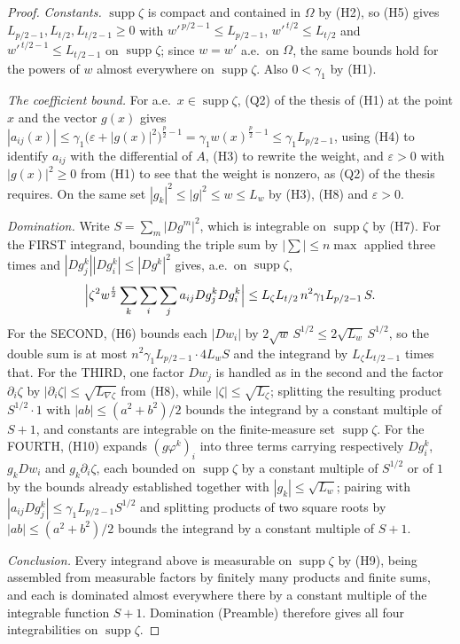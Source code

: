 \begin{proof}
\emph{Constants.}  $\operatorname{supp}\zeta$ is compact and contained in
$\Omega$ by (H2), so (H5) gives $L_{p/2-1},L_{t/2},L_{t/2-1}\ge0$ with
$w'^{\,p/2-1}\le L_{p/2-1}$, $w'^{\,t/2}\le L_{t/2}$ and
$w'^{\,t/2-1}\le L_{t/2-1}$ on $\operatorname{supp}\zeta$; since $w=w'$ a.e.\
on $\Omega$, the same bounds hold for the powers of $w$ almost everywhere on
$\operatorname{supp}\zeta$.  Also $0<\gamma_1$ by (H1).

\emph{The coefficient bound.}  For a.e.\ $x\in\operatorname{supp}\zeta$,
(Q2) of the thesis of (H1) at the point $x$ and the vector $g(x)$ gives
$|a_{ij}(x)|\le\gamma_1\bigl(\varepsilon+|g(x)|^2\bigr)^{\frac p2-1}
  =\gamma_1w(x)^{\frac p2-1}\le\gamma_1L_{p/2-1}$,
using (H4) to identify $a_{ij}$ with the differential of $A$, (H3) to rewrite
the weight, and $\varepsilon>0$ with $|g(x)|^2\ge0$ from (H1) to see that the
weight is nonzero, as (Q2) of the thesis requires.  On the same set $|g_k|^2\le|g|^2
\le w\le L_w$ by (H3), (H8) and $\varepsilon>0$.

\emph{Domination.}  Write $S=\sum_m|Dg^m|^2$, which is integrable on
$\operatorname{supp}\zeta$ by (H7).  For the FIRST integrand, bounding the
triple sum by $|\sum|\le n\max$ applied three times and
$|Dg^k_j||Dg^k_i|\le|Dg^k|^2$ gives, a.e.\ on $\operatorname{supp}\zeta$,
\[
\Bigl|\zeta^2w^{\frac t2}\sum_k\sum_i\sum_ja_{ij}Dg^k_jDg^k_i\Bigr|
\le L_\zeta L_{t/2}\,n^2\gamma_1L_{p/2-1}\,S .
\]
For the SECOND, (H6) bounds each $|Dw_i|$ by
$2\sqrt{w}\,S^{1/2}\le2\sqrt{L_w}\,S^{1/2}$, so the double sum is at most
$n^2\gamma_1L_{p/2-1}\cdot4L_wS$ and the integrand by
$L_\zeta L_{t/2-1}$ times that.  For the THIRD, one factor $Dw_j$ is handled as
in the second and the factor $\partial_i\zeta$ by
$|\partial_i\zeta|\le\sqrt{L_{\nabla\zeta}}$ from (H8), while
$|\zeta|\le\sqrt{L_\zeta}$; splitting the resulting product $S^{1/2}\cdot1$
with $|ab|\le(a^2+b^2)/2$ bounds the integrand by a constant multiple of
$S+1$, and constants are integrable on the finite-measure set
$\operatorname{supp}\zeta$.  For the FOURTH, (H10) expands
$(g\varphi^k)_i$ into three terms carrying respectively $Dg^k_i$, $g_kDw_i$ and
$g_k\partial_i\zeta$, each bounded on $\operatorname{supp}\zeta$ by a constant
multiple of $S^{1/2}$ or of $1$ by the bounds already established together
with $|g_k|\le\sqrt{L_w}$; pairing with $|a_{ij}Dg^k_j|\le
\gamma_1L_{p/2-1}S^{1/2}$ and splitting products of two square roots by
$|ab|\le(a^2+b^2)/2$ bounds the integrand by a constant multiple of $S+1$.

\emph{Conclusion.}  Every integrand above is measurable on
$\operatorname{supp}\zeta$ by (H9), being assembled from measurable factors by
finitely many products and finite sums, and each is dominated almost everywhere
there by a constant multiple of the integrable function $S+1$.  Domination
(Preamble) therefore gives all four integrabilities on $\operatorname{supp}\zeta$.
\end{proof}
